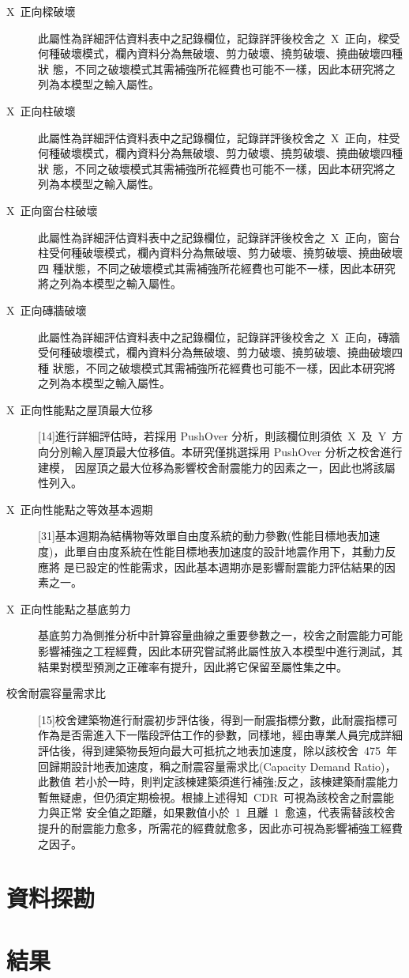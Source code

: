 \begin{description}
  \item[X~正向樑破壞]
  此屬性為詳細評估資料表中之記錄欄位，記錄詳評後校舍之~X~正向，樑受何種破壞模式，欄內資料分為無破壞、剪力破壞、撓剪破壞、撓曲破壞四種狀 態，不同之破壞模式其需補強所花經費也可能不一樣，因此本研究將之列為本模型之輸入屬性。
  \item[X~正向柱破壞]
  此屬性為詳細評估資料表中之記錄欄位，記錄詳評後校舍之~X~正向，柱受何種破壞模式，欄內資料分為無破壞、剪力破壞、撓剪破壞、撓曲破壞四種狀 態，不同之破壞模式其需補強所花經費也可能不一樣，因此本研究將之列為本模型之輸入屬性。
  \item[X~正向窗台柱破壞]
  此屬性為詳細評估資料表中之記錄欄位，記錄詳評後校舍之~X~正向，窗台柱受何種破壞模式，欄內資料分為無破壞、剪力破壞、撓剪破壞、撓曲破壞四 種狀態，不同之破壞模式其需補強所花經費也可能不一樣，因此本研究將之列為本模型之輸入屬性。
  \item[X~正向磚牆破壞]
  此屬性為詳細評估資料表中之記錄欄位，記錄詳評後校舍之~X~正向，磚牆受何種破壞模式，欄內資料分為無破壞、剪力破壞、撓剪破壞、撓曲破壞四種 狀態，不同之破壞模式其需補強所花經費也可能不一樣，因此本研究將之列為本模型之輸入屬性。
  \item[X~正向性能點之屋頂最大位移]
  [14]進行詳細評估時，若採用 PushOver 分析，則該欄位則須依~X~及~Y~方向分別輸入屋頂最大位移值。本研究僅挑選採用 PushOver 分析之校舍進行建模， 因屋頂之最大位移為影響校舍耐震能力的因素之一，因此也將該屬性列入。
  \item[X~正向性能點之等效基本週期]
  [31]基本週期為結構物等效單自由度系統的動力參數(性能目標地表加速度)，此單自由度系統在性能目標地表加速度的設計地震作用下，其動力反應將 是已設定的性能需求，因此基本週期亦是影響耐震能力評估結果的因素之一。
  \item[X~正向性能點之基底剪力]
  基底剪力為側推分析中計算容量曲線之重要參數之一，校舍之耐震能力可能影響補強之工程經費，因此本研究嘗試將此屬性放入本模型中進行測試，其 結果對模型預測之正確率有提升，因此將它保留至屬性集之中。
  \item[校舍耐震容量需求比]
  [15]校舍建築物進行耐震初步評估後，得到一耐震指標分數，此耐震指標可作為是否需進入下一階段評估工作的參數，同樣地，經由專業人員完成詳細 評估後，得到建築物長短向最大可抵抗之地表加速度，除以該校舍~475~年回歸期設計地表加速度，稱之耐震容量需求比(Capacity Demand Ratio)，此數值 若小於一時，則判定該棟建築須進行補強;反之，該棟建築耐震能力暫無疑慮，但仍須定期檢視。根據上述得知~CDR~可視為該校舍之耐震能力與正常 安全值之距離，如果數值小於~1~且離~1~愈遠，代表需替該校舍提升的耐震能力愈多，所需花的經費就愈多，因此亦可視為影響補強工經費之因子。
\end{description}

\section{資料探勘}

\section{結果}

